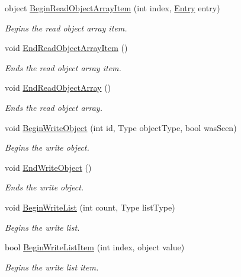 \begin{DoxyCompactItemize}
object \hyperlink{interface_serialization_1_1_i_storage_a3d3197fc76431c156d291c5e46240018}{Begin\+Read\+Object\+Array\+Item} (int index, \hyperlink{class_serialization_1_1_entry}{Entry} entry)
\begin{DoxyCompactList}\small\item\em Begins the read object array item. \end{DoxyCompactList}\item 
void \hyperlink{interface_serialization_1_1_i_storage_a0b02021d3b80d7a3b66657aca7e50683}{End\+Read\+Object\+Array\+Item} ()
\begin{DoxyCompactList}\small\item\em Ends the read object array item. \end{DoxyCompactList}\item 
void \hyperlink{interface_serialization_1_1_i_storage_adcb0b93e93558a3ae5453c36bb04d8ff}{End\+Read\+Object\+Array} ()
\begin{DoxyCompactList}\small\item\em Ends the read object array. \end{DoxyCompactList}\item 
void \hyperlink{interface_serialization_1_1_i_storage_a3fb97eb3491469373d49dfa190c66dd4}{Begin\+Write\+Object} (int id, Type object\+Type, bool was\+Seen)
\begin{DoxyCompactList}\small\item\em Begins the write object. \end{DoxyCompactList}\item 
void \hyperlink{interface_serialization_1_1_i_storage_a6e6a7469ad14b39e46cd746d4bf3d2ca}{End\+Write\+Object} ()
\begin{DoxyCompactList}\small\item\em Ends the write object. \end{DoxyCompactList}\item 
void \hyperlink{interface_serialization_1_1_i_storage_afaa8cb1cee211688a43655b1f503ca12}{Begin\+Write\+List} (int count, Type list\+Type)
\begin{DoxyCompactList}\small\item\em Begins the write list. \end{DoxyCompactList}\item 
bool \hyperlink{interface_serialization_1_1_i_storage_a1f2891613afdde349dd1bede1187af08}{Begin\+Write\+List\+Item} (int index, object value)
\begin{DoxyCompactList}\small\item\em Begins the write list item. \end{DoxyCompactList}\item 

\end{DoxyCompactItemize}
